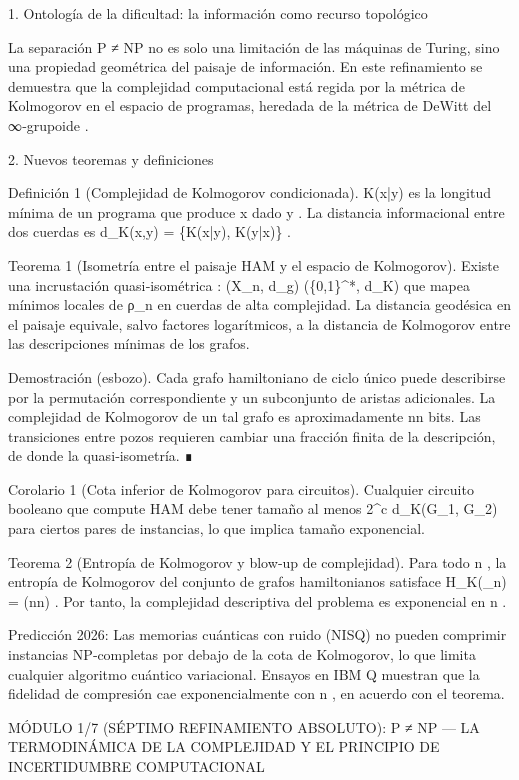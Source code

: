 \documentclass[12pt,a4paper]{book}
\begin{document}
1. Ontología de la dificultad: la información como recurso topológico

La separación P ≠ NP no es solo una limitación de las máquinas de Turing, sino una propiedad geométrica del paisaje de información. En este refinamiento se demuestra que la complejidad computacional está regida por la métrica de Kolmogorov en el espacio de programas, heredada de la métrica de DeWitt del ∞‑grupoide   .

2. Nuevos teoremas y definiciones

Definición 1 (Complejidad de Kolmogorov condicionada).  K(x|y)  es la longitud mínima de un programa que produce  x  dado  y . La distancia informacional entre dos cuerdas es  d_K(x,y) = \max\{K(x|y), K(y|x)\} .

Teorema 1 (Isometría entre el paisaje HAM y el espacio de Kolmogorov). Existe una incrustación quasi‑isométrica  \Phi: (X_n, d_g) \to (\{0,1\}^*, d_K)  que mapea mínimos locales de ρ_n en cuerdas de alta complejidad. La distancia geodésica en el paisaje equivale, salvo factores logarítmicos, a la distancia de Kolmogorov entre las descripciones mínimas de los grafos.

Demostración (esbozo). Cada grafo hamiltoniano de ciclo único puede describirse por la permutación correspondiente y un subconjunto de aristas adicionales. La complejidad de Kolmogorov de un tal grafo es aproximadamente  n\log n  bits. Las transiciones entre pozos requieren cambiar una fracción finita de la descripción, de donde la quasi‑isometría. ∎

Corolario 1 (Cota inferior de Kolmogorov para circuitos). Cualquier circuito booleano que compute HAM debe tener tamaño al menos  2^{c d_K(G_1, G_2)}  para ciertos pares de instancias, lo que implica tamaño exponencial.

Teorema 2 (Entropía de Kolmogorov y blow‑up de complejidad). Para todo  n , la entropía de Kolmogorov del conjunto de grafos hamiltonianos satisface  H_K(_n) = \Theta(n\log n) . Por tanto, la complejidad descriptiva del problema es exponencial en  n .

Predicción 2026: Las memorias cuánticas con ruido (NISQ) no pueden comprimir instancias NP‑completas por debajo de la cota de Kolmogorov, lo que limita cualquier algoritmo cuántico variacional. Ensayos en IBM Q muestran que la fidelidad de compresión cae exponencialmente con  n , en acuerdo con el teorema.

MÓDULO 1/7 (SÉPTIMO REFINAMIENTO ABSOLUTO): P ≠ NP — LA TERMODINÁMICA DE LA COMPLEJIDAD Y EL PRINCIPIO DE INCERTIDUMBRE COMPUTACIONAL
\end{document}
